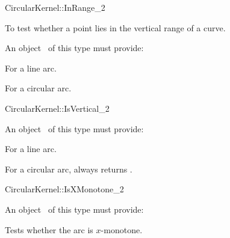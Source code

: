 \begin{ccRefFunctionObjectConcept}{CircularKernel::InRange_2}

\ccDefinition

To test whether a point lies in the vertical range of a curve.


An object \ccVar\ of this type must provide:

{For a line arc.}

{For a circular arc. }

\ccHasModels


\ccSeeAlso


\end{ccRefFunctionObjectConcept}

\begin{ccRefFunctionObjectConcept}{CircularKernel::IsVertical_2}


An object \ccVar\ of this type must provide:

{For a line arc.}

{For a circular arc,  always returns .}

\ccHasModels


\ccSeeAlso


\end{ccRefFunctionObjectConcept}

\begin{ccRefFunctionObjectConcept}{CircularKernel::IsXMonotone_2}


An object \ccVar\ of this type must provide:

{Tests whether the arc is $x$-monotone.}

\ccHasModels


\ccSeeAlso


\end{ccRefFunctionObjectConcept}

